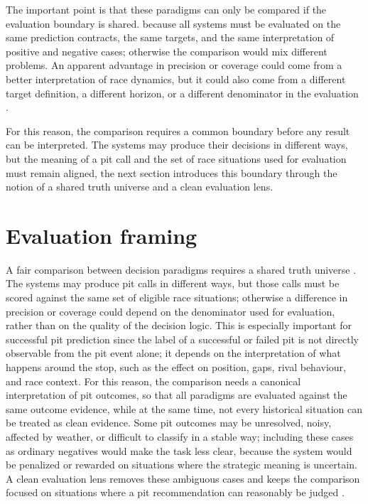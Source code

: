 The important point is that these paradigms can only be compared if the evaluation boundary is shared. because
all systems must be evaluated on the same prediction contracts, the same targets, and the same interpretation of positive and negative cases;
otherwise the comparison would mix different problems.
An apparent advantage in precision or coverage could come from a better interpretation of race dynamics, but it could also come from a different target definition, a different horizon,
or a different denominator in the evaluation \citep{roberts2017cvstructured,brookshire2024leakage}.

For this reason, the comparison requires a common boundary before any result can be interpreted.
The systems may produce their decisions in different ways, but the meaning of a pit call and the set of race situations used for evaluation must remain aligned,
the next section introduces this boundary through the notion of a shared truth universe and a clean evaluation lens.

\section{Evaluation framing}
A fair comparison between decision paradigms requires a shared truth universe \citep{roberts2017cvstructured,brookshire2024leakage}.
The systems may produce pit calls in different ways, but those calls must be scored against the same set of eligible race situations;
otherwise a difference in precision or coverage could depend on the denominator used for evaluation, rather than on the quality of the decision logic.
This is especially important for successful pit prediction since the label of a successful or failed pit is not directly observable from the pit event alone;
it depends on the interpretation of what happens around the stop, such as the effect on position, gaps, rival behaviour, and race context.
For this reason, the comparison needs a canonical interpretation of pit outcomes, so that all paradigms are evaluated against the same outcome evidence, while
at the same time, not every historical situation can be treated as clean evidence.
Some pit outcomes may be unresolved, noisy, affected by weather, or difficult to classify in a stable way;
including these cases as ordinary negatives would make the task less clear, because the system would be penalized or rewarded on situations where the strategic meaning is uncertain.
A clean evaluation lens removes these ambiguous cases and keeps the comparison focused on situations where a pit recommendation can reasonably be judged \citep{brookshire2024leakage,roberts2017cvstructured}.

